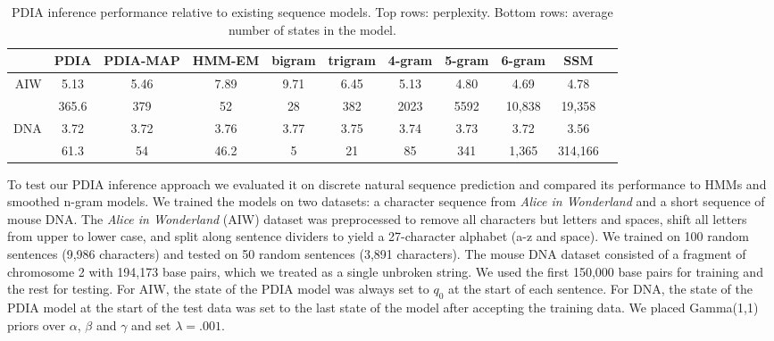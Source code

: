 \begin{table}[t]
    \begin{center}
    \setlength{\tabcolsep}{1.3mm}
\begin{tabular}{r|cccccccccc}
\hline
& PDIA  & PDIA-MAP &  HMM-EM & bigram& trigram & 4-gram & 5-gram & 6-gram & SSM \\
\hline
AIW & 5.13 & 5.46 &  7.89 & 9.71 & 6.45 & 5.13 & 4.80 & 4.69 & 4.78 \\
  & 365.6 & 379 & 52 & 28 & 382 & 2023 & 5592 & 10,838 & 19,358 \\
\hline
\hline
DNA & 3.72 & 3.72 &  3.76 & 3.77 & 3.75 & 3.74 & 3.73 & 3.72 & 3.56 \\
 & 61.3 & 54 & 46.2 &  5 & 21 & 85 & 341 & 1,365 & 314,166 \\
\hline
\end{tabular}
\end{center}
\caption[Short]{PDIA inference performance relative to existing sequence models.  Top rows: perplexity.  Bottom rows: average number of states in the model.}
\label{table:results}
\end{table}

To test our PDIA inference approach we evaluated it on discrete natural sequence prediction and compared its performance to HMMs and smoothed n-gram models.  We trained the models on two datasets: a character sequence from {\em Alice in Wonderland} \cite{Carroll1865} and a short sequence of mouse DNA.  The {\em Alice in Wonderland} (AIW) dataset was preprocessed to remove all characters but letters and spaces, shift all letters from upper to lower case, and split along sentence dividers to yield a 27-character alphabet (a-z and space).  We trained on 100 random sentences (9,986 characters) and tested on 50 random sentences (3,891 characters).   The mouse DNA dataset consisted of a fragment of chromosome 2 with 194,173 base pairs, which we treated as a single unbroken string.  We used the first 150,000 base pairs for training and the rest for testing.  For AIW, the state of the PDIA model was always set to $q_0$ at the start of each sentence.  For DNA, the state of the PDIA model at the start of the test data was set to the last state of the model after accepting the training data.  We placed Gamma(1,1) priors over $\alpha$, $\beta$ and $\gamma$ and set $\lambda=.001$.

